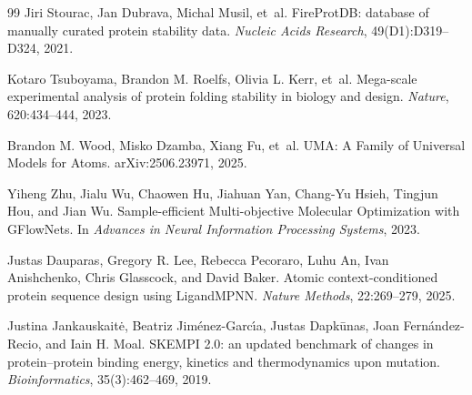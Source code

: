 \documentclass[11pt]{article}
\begin{document}
\begin{thebibliography}{99}
		Jiri Stourac, Jan Dubrava, Michal Musil, et~al.
		\newblock FireProtDB: database of manually curated protein stability data.
		\newblock \emph{Nucleic Acids Research}, 49(D1):D319--D324, 2021.
		
		Kotaro Tsuboyama, Brandon M. Roelfs, Olivia L. Kerr, et~al.
		\newblock Mega-scale experimental analysis of protein folding stability in biology and design.
		\newblock \emph{Nature}, 620:434--444, 2023.
		
		Brandon M. Wood, Misko Dzamba, Xiang Fu, et~al.
		\newblock UMA: A Family of Universal Models for Atoms.
		\newblock arXiv:2506.23971, 2025.
		
		Yiheng Zhu, Jialu Wu, Chaowen Hu, Jiahuan Yan, Chang-Yu Hsieh, Tingjun Hou, and Jian Wu.
		\newblock Sample-efficient Multi-objective Molecular Optimization with GFlowNets.
		\newblock In \emph{Advances in Neural Information Processing Systems}, 2023.
		
		
		
		Justas Dauparas, Gregory R. Lee, Rebecca Pecoraro, Luhu An, Ivan Anishchenko, Chris Glasscock, and David Baker.
		\newblock Atomic context-conditioned protein sequence design using LigandMPNN.
		\newblock \emph{Nature Methods}, 22:269--279, 2025.
		
		Justina Jankauskait{\.e}, Beatriz Jim{\'e}nez-Garc{\'\i}a, Justas Dapk{\=u}nas, Joan Fern{\'a}ndez-Recio, and Iain H. Moal.
		\newblock SKEMPI 2.0: an updated benchmark of changes in protein--protein binding energy, kinetics and thermodynamics upon mutation.
		\newblock \emph{Bioinformatics}, 35(3):462--469, 2019.
		
		
	\end{thebibliography}
	
	
\end{document}

